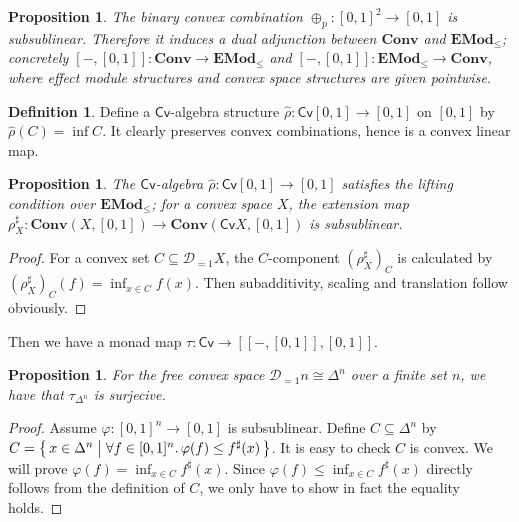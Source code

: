 \documentclass[9pt, preprint]{sigplanconf}
\theoremstyle{theorem}
\newtheorem{proposition}[theorem]{Proposition}
\theoremstyle{definition}
\newtheorem{definition}[theorem]{Definition}
\renewcommand{\phi}{\varphi}
\newcommand{\dist}{\mathcal{D}_{=1}}
\newcommand{\set}[2]{\left\{\, #1 \mathrel{}\middle|\mathrel{} #2 \,\right\}}
\newcommand{\place}{{-}}
\newcommand{\uintv}{[0, 1]}
\newcommand{\Conv}{\mathbf{Conv}}
\renewcommand{\subset}{\subseteq}
\newcommand{\EMod}{\mathbf{EMod}}
\newcommand{\RC}{\mathsf{Cv}}
\begin{document}
{\begin{proposition}
  The binary convex combination $\oplus_p \colon \uintv^2 \to \uintv$
  is subsublinear. Therefore it induces a dual adjunction between
  $\Conv$ and $\EMod_{\le}$; concretely
  $[\place, \uintv] \colon \Conv \to \EMod_{\le}$
  and $[\place, \uintv] \colon \EMod_{\le} \to \Conv$,
  where effect module structures and convex space structures
  are given pointwise.
\end{proposition}

\begin{definition}
  Define a $\RC$-algebra structure
  $\hat{\rho} \colon \RC \uintv \to \uintv$ on $\uintv$
  by $\hat{\rho}(C) = \inf C$.
  It clearly preserves convex combinations, hence is a convex linear map.
\end{definition}

\begin{proposition}
  The $\RC$-algebra $\hat{\rho} \colon \RC \uintv \to \uintv$
  satisfies the lifting condition over $\EMod_{\leq}$;
  for a convex space $X$, the extension map
  $\rho^{\sharp}_X \colon \Conv(X, \uintv) \to \Conv(\RC X, \uintv)$
  is subsublinear.
\end{proposition}
\begin{proof}
  For a convex set $C \subset \dist X$, the $C$-component
  $(\rho_X^{\sharp})_C$ is calculated by
  $(\rho_X^{\sharp})_C (f) = \inf_{x \in C} f(x)$.
  Then subadditivity, scaling and translation follow obviously.
\end{proof}

Then we have a monad map $\tau \colon \RC \to [[\place , \uintv], \uintv]$.

\begin{proposition}
  For the free convex space $\dist n \cong \Delta^n$ over a finite set $n$,
  we have that $\tau_{\Delta^n}$ is surjecive.
\end{proposition}
\begin{proof}
  Assume $\phi \colon \uintv^n \to \uintv$ is subsublinear.
  Define $C \subset \Delta^n$ by
  $C = \set{x \in \Delta^n}
        {\forall f \in \uintv^n \ldotp \phi(f) \leq f^{\sharp}(x)}$.
  It is easy to check $C$ is convex.
  We will prove $\phi(f) = \inf_{x \in C} f^{\sharp}(x)$.
  Since $\phi(f) \leq \inf_{x \in C} f^{\sharp}(x)$ directly follows from
  the definition of $C$, we only have to show in fact the equality holds.


\end{proof}}
\end{document}

